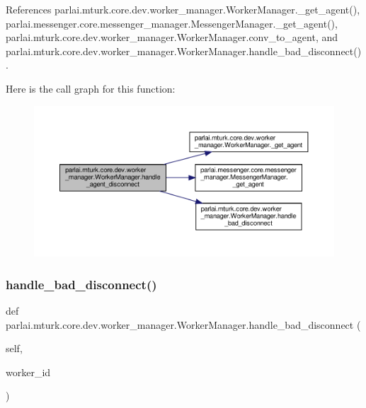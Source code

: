 References parlai.\+mturk.\+core.\+dev.\+worker\+\_\+manager.\+Worker\+Manager.\+\_\+get\+\_\+agent(), parlai.\+messenger.\+core.\+messenger\+\_\+manager.\+Messenger\+Manager.\+\_\+get\+\_\+agent(), parlai.\+mturk.\+core.\+dev.\+worker\+\_\+manager.\+Worker\+Manager.\+conv\+\_\+to\+\_\+agent, and parlai.\+mturk.\+core.\+dev.\+worker\+\_\+manager.\+Worker\+Manager.\+handle\+\_\+bad\+\_\+disconnect().

Here is the call graph for this function\+:
\nopagebreak
\begin{figure}[H]
\begin{center}
\leavevmode
\includegraphics[width=350pt]{classparlai_1_1mturk_1_1core_1_1dev_1_1worker__manager_1_1WorkerManager_aaeb48ce35a7793d501d2a317ea225526_cgraph}
\end{center}
\end{figure}
\mbox{\label{classparlai_1_1mturk_1_1core_1_1dev_1_1worker__manager_1_1WorkerManager_ae527be446b326d4252304cf89850aff8}} 
\subsubsection{\texorpdfstring{handle\+\_\+bad\+\_\+disconnect()}{handle\_bad\_disconnect()}}
{\footnotesize\ttfamily def parlai.\+mturk.\+core.\+dev.\+worker\+\_\+manager.\+Worker\+Manager.\+handle\+\_\+bad\+\_\+disconnect (\begin{DoxyParamCaption}\item[{}]{self,  }\item[{}]{worker\+\_\+id }\end{DoxyParamCaption})}

